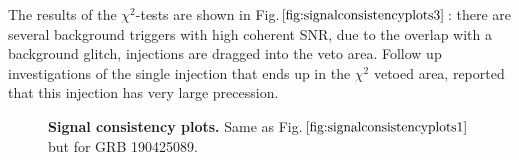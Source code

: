 \documentclass[binding=0.6cm, LaM]{sapthesis}
\begin{document}
	The results of the $\chi^2$-tests are shown in Fig.$\ref{fig:signalconsistencyplots3}$:
	there are several background triggers with high coherent SNR,
	due to the  overlap with a background glitch, 
	injections are dragged into the veto area.
	Follow up investigations of the single injection that ends up in the $\chi^2$ vetoed area,
	reported that this injection has very large precession.
		\begin{figure}[!t]
         		\noindent
          		\label{signalconsistencyplots3}
          		\centering
          		\caption{\textbf{Signal consistency plots.} Same as Fig.$\ref{fig:signalconsistencyplots1}$ but for GRB 190425089.}
         		\label{fig:signalconsistencyplots3}
       		\end{figure}
\end{document}
